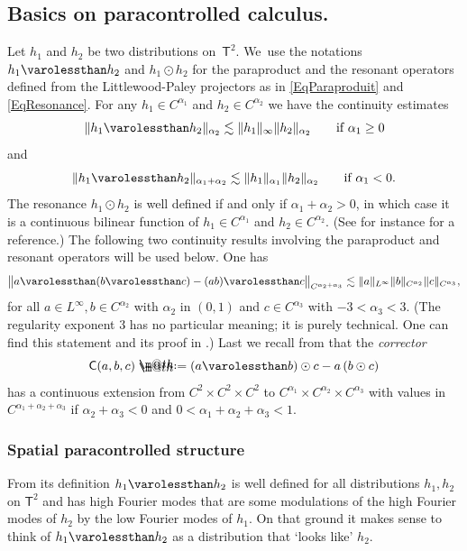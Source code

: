 \documentclass[10pt]{amsart}
\makeatletter
\theoremstyle{definition}
\newcommand{\bsfT}{\mathbf{\mathsf{T}}}
\newcommand*{\defeq}{\mathrel{\rlap{%
\raisebox{0.3ex}{$\m@th\cdot$}}%
\raisebox{-0.3ex}{$\m@th\cdot$}}%
=}
\makeatother
\begin{document}
\subsection{Basics on paracontrolled calculus. }
\label{SubsectionBasics}

Let $h_1$ and $h_2$ be two distributions on~$\bsfT^2$. We~use the notations $h_1\varolessthan h_2$ and $h_1\odot h_2$ for the paraproduct and the resonant operators defined from the Littlewood-Paley projectors as in \eqref{EqParaproduit} and \eqref{EqResonance}. For any $h_1\in C^{\alpha_1}$ and $h_2\in C^{\alpha_2}$ we have the continuity estimates
\[
\Vert h_1\varolessthan h_2 \Vert_{\alpha_2} \lesssim \Vert h_1\Vert_\infty \Vert h_2\Vert_{\alpha_2} \qquad \textrm{if $\alpha_1\geq 0$}
\]
and
\[
\Vert h_1\varolessthan h_2 \Vert_{\alpha_1+\alpha_2} \lesssim \Vert h_1\Vert_{\alpha_1} \Vert h_2\Vert_{\alpha_2} \qquad \textrm{if $\alpha_1<0$}.
\]
The resonance $h_1\odot h_2$ is well defined if and only if $\alpha_1+\alpha_2>0$, in which case it is a continuous bilinear function of $h_1\in C^{\alpha_1}$ and $h_2\in C^{\alpha_2}$. (See for instance \cite[\S2.6]{BCD} for a reference.) The following two continuity results involving the paraproduct and resonant operators will be used below. One has
\begin{equation} \label{EqRContinuity}
\big\Vert a \varolessthan (b \varolessthan c) - (ab) \varolessthan c \big\Vert_{C^{\alpha_2+\alpha_3}} \lesssim \Vert a\Vert_{L^\infty} \Vert b\Vert_{C^{\alpha_2}} \Vert c\Vert_{C^{\alpha_3}},
\end{equation}
for all $a\in L^\infty, b\in C^{\alpha_2}$ with $\alpha_2$ in $(0,1)$ and $c\in C^{\alpha_3}$ with $-3<\alpha_3<3$. (The regularity exponent $3$ has no particular meaning; it is purely technical. One can find this statement and its proof in \cite[Prop.\,14]{BailleulBernicotHighOrder}.) Last we recall from \cite[Lem.\,2.4]{GIP} that the {\it corrector}
\[
\mathsf{C}(a,b,c) \defeq (a\varolessthan b)\odot c - a \, (b\odot c)
\]
has a continuous extension from $C^2\times C^2\times C^2$ to $C^{\alpha_1}\times C^{\alpha_2}\times C^{\alpha_3}$ with values in $C^{\alpha_1+\alpha_2+\alpha_3}$ if $\alpha_2+\alpha_3<0$ and $0<\alpha_1+\alpha_2+\alpha_3<1$.

\subsubsection{Spatial paracontrolled structure} From its definition $h_1 \varolessthan h_2$ is well defined for all distributions $h_1,h_2$ on $\bsfT^2$ and has high Fourier modes that are some modulations of the high Fourier modes of $h_2$ by the low Fourier modes of $h_1$. On that ground it makes sense to think of $h_1\varolessthan h_2$ as a distribution that `looks like' $h_2$.
\end{document}
